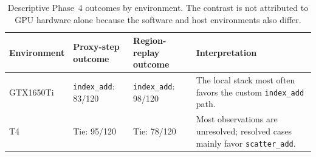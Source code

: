 \begin{table}[tbp]
\centering\fontsize{9}{11}\selectfont
\caption{Descriptive Phase~4 outcomes by environment. The contrast is not attributed to GPU hardware alone because the software and host environments also differ.}
\label{tab:phase4-environment-comparison}
\setlength{\tabcolsep}{3pt}
\begin{tabularx}{\linewidth}{lXXX}
\toprule
Environment & Proxy-step outcome & Region-replay outcome & Interpretation \\
\midrule
GTX1650Ti & \texttt{index\_add}: 83/120 & \texttt{index\_add}: 98/120 & The local stack most often favors the custom \texttt{index\_add} path. \\
T4 & Tie: 95/120 & Tie: 78/120 & Most observations are unresolved; resolved cases mainly favor \texttt{scatter\_add}. \\
\bottomrule
\end{tabularx}
\end{table}